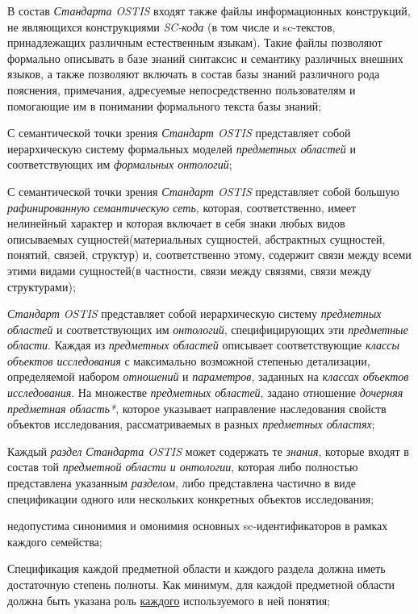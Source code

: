 \begin{textitemize}
	\item В состав \textit{Стандарта OSTIS} входят также файлы информационных конструкций, не являющихся конструкциями \textit{SC-кода} (в том числе и sc-текстов, принадлежащих различным естественным языкам). Такие файлы позволяют формально описывать в базе знаний синтаксис и семантику различных внешних языков, а также позволяют включать в состав базы знаний различного рода пояснения, примечания, адресуемые непосредственно пользователям и помогающие им в понимании формального текста базы знаний;
	\item С семантической точки зрения \textit{Стандарт OSTIS} представляет собой иерархическую систему формальных моделей \textit{предметных областей} и соответствующих им \textit{формальных онтологий};
	\item С семантической точки зрения \textit{Стандарт OSTIS} представляет собой большую \textit{рафинированную семантическую сеть}, которая, соответственно, имеет нелинейный характер и которая включает в себя знаки любых видов описываемых сущностей(материальных сущностей, абстрактных сущностей, понятий, связей, структур) и, соответственно этому, содержит связи между всеми этими видами сущностей(в частности, связи между связями, связи между структурами);
	\item \textit{Стандарт OSTIS} представляет собой иерархическую систему \textit{предметных областей} и соответствующих им \textit{онтологий}, специфицирующих эти \textit{предметные области}. Каждая из \textit{предметных областей} описывает соответствующие \textit{классы объектов исследования} с максимально возможной степенью детализации, определяемой набором \textit{отношений} и \textit{параметров}, заданных на \textit{классах объектов исследования}. На множестве \textit{предметных областей}, задано отношение \textit{дочерняя предметная область*}, которое указывает направление наследования свойств объектов исследования, рассматриваемых в разных \textit{предметных областях};
	\item Каждый \textit{раздел Стандарта OSTIS} может содержать те \textit{знания}, которые входят в состав той \textit{предметной области и онтологии}, которая либо полностью представлена указанным \textit{разделом}, либо представлена частично в виде спецификации одного или нескольких конкретных объектов исследования;
	\item недопустима синонимия и омонимия основных sc-идентификаторов в рамках каждого семейства;
	\item Спецификация каждой предметной области и каждого раздела должна иметь достаточную степень полноты. Как минимум, для каждой предметной области должна быть указана роль \uline{каждого} используемого в ней понятия;

\end{textitemize}
